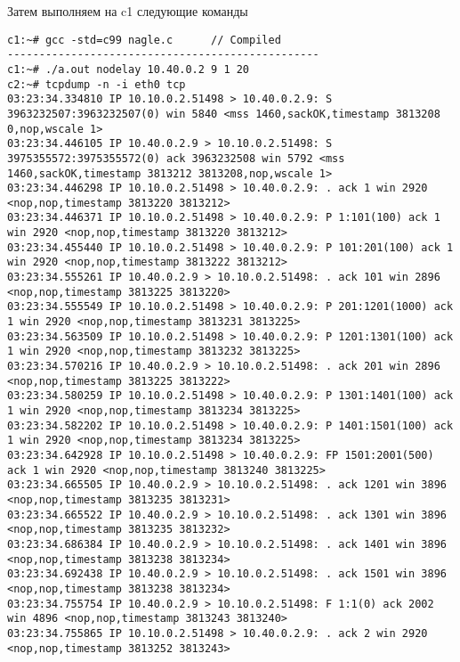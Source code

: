 \documentclass[a4paper,12pt]{article}
\begin{document}
Затем выполняем на c1 следующие команды

\begin{lstlisting}
c1:~# gcc -std=c99 nagle.c      // Compiled
-------------------------------------------------
c1:~# ./a.out nodelay 10.40.0.2 9 1 20
c2:~# tcpdump -n -i eth0 tcp
03:23:34.334810 IP 10.10.0.2.51498 > 10.40.0.2.9: S 3963232507:3963232507(0) win 5840 <mss 1460,sackOK,timestamp 3813208 0,nop,wscale 1>
03:23:34.446105 IP 10.40.0.2.9 > 10.10.0.2.51498: S 3975355572:3975355572(0) ack 3963232508 win 5792 <mss 1460,sackOK,timestamp 3813212 3813208,nop,wscale 1>
03:23:34.446298 IP 10.10.0.2.51498 > 10.40.0.2.9: . ack 1 win 2920 <nop,nop,timestamp 3813220 3813212>
03:23:34.446371 IP 10.10.0.2.51498 > 10.40.0.2.9: P 1:101(100) ack 1 win 2920 <nop,nop,timestamp 3813220 3813212>
03:23:34.455440 IP 10.10.0.2.51498 > 10.40.0.2.9: P 101:201(100) ack 1 win 2920 <nop,nop,timestamp 3813222 3813212>
03:23:34.555261 IP 10.40.0.2.9 > 10.10.0.2.51498: . ack 101 win 2896 <nop,nop,timestamp 3813225 3813220>
03:23:34.555549 IP 10.10.0.2.51498 > 10.40.0.2.9: P 201:1201(1000) ack 1 win 2920 <nop,nop,timestamp 3813231 3813225>
03:23:34.563509 IP 10.10.0.2.51498 > 10.40.0.2.9: P 1201:1301(100) ack 1 win 2920 <nop,nop,timestamp 3813232 3813225>
03:23:34.570216 IP 10.40.0.2.9 > 10.10.0.2.51498: . ack 201 win 2896 <nop,nop,timestamp 3813225 3813222>
03:23:34.580259 IP 10.10.0.2.51498 > 10.40.0.2.9: P 1301:1401(100) ack 1 win 2920 <nop,nop,timestamp 3813234 3813225>
03:23:34.582202 IP 10.10.0.2.51498 > 10.40.0.2.9: P 1401:1501(100) ack 1 win 2920 <nop,nop,timestamp 3813234 3813225>
03:23:34.642928 IP 10.10.0.2.51498 > 10.40.0.2.9: FP 1501:2001(500) ack 1 win 2920 <nop,nop,timestamp 3813240 3813225>
03:23:34.665505 IP 10.40.0.2.9 > 10.10.0.2.51498: . ack 1201 win 3896 <nop,nop,timestamp 3813235 3813231>
03:23:34.665522 IP 10.40.0.2.9 > 10.10.0.2.51498: . ack 1301 win 3896 <nop,nop,timestamp 3813235 3813232>
03:23:34.686384 IP 10.40.0.2.9 > 10.10.0.2.51498: . ack 1401 win 3896 <nop,nop,timestamp 3813238 3813234>
03:23:34.692438 IP 10.40.0.2.9 > 10.10.0.2.51498: . ack 1501 win 3896 <nop,nop,timestamp 3813238 3813234>
03:23:34.755754 IP 10.40.0.2.9 > 10.10.0.2.51498: F 1:1(0) ack 2002 win 4896 <nop,nop,timestamp 3813243 3813240>
03:23:34.755865 IP 10.10.0.2.51498 > 10.40.0.2.9: . ack 2 win 2920 <nop,nop,timestamp 3813252 3813243>


\end{lstlisting}
\end{document}

